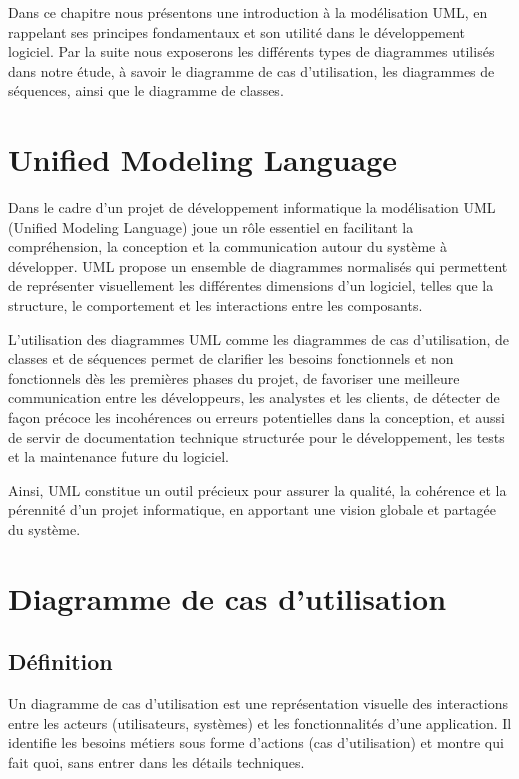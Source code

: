 \documentclass[12pt,a4paper]{report}
\begin{document}
	Dans ce chapitre nous présentons une introduction à la modélisation UML, en rappelant ses principes fondamentaux et son utilité dans le développement logiciel. Par la suite nous exposerons les différents types de diagrammes utilisés dans notre étude, à savoir le diagramme de cas d’utilisation, les diagrammes de séquences, ainsi que le diagramme de classes.
	
	\section{Unified Modeling Language}
	
	Dans le cadre d’un projet de développement informatique la modélisation UML (Unified Modeling Language) joue un rôle essentiel en facilitant la compréhension, la conception et la communication autour du système à développer. UML propose un ensemble de diagrammes normalisés qui permettent de représenter visuellement les différentes dimensions d’un logiciel, telles que la structure, le comportement et les interactions entre les composants.
	
	L’utilisation des diagrammes UML comme les diagrammes de cas d’utilisation, de classes et de séquences permet de clarifier les besoins fonctionnels et non fonctionnels dès les premières phases du projet, de favoriser une meilleure communication entre les développeurs, les analystes et les clients, de détecter de façon précoce les incohérences ou erreurs potentielles dans la conception, et aussi de servir de documentation technique structurée pour le développement, les tests et la maintenance future du logiciel.
	
	Ainsi, UML constitue un outil précieux pour assurer la qualité, la cohérence et la pérennité d’un projet informatique, en apportant une vision globale et partagée du système.
	
	\section{Diagramme de cas d'utilisation}
	
	\subsection{Définition}
	
	Un diagramme de cas d'utilisation est une représentation visuelle des interactions entre les acteurs (utilisateurs, systèmes) et les fonctionnalités d'une application. Il identifie les besoins métiers sous forme d'actions (cas d’utilisation) et montre qui fait quoi, sans entrer dans les détails techniques.
	
\end{document}
